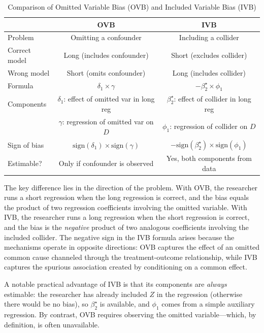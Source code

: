 \documentclass[
]{article}
\begin{document}
\begin{table}[H]
\centering
\caption{Comparison of Omitted Variable Bias (OVB) and Included Variable Bias (IVB)}
\label{tab:ovb_ivb}
\begin{tabular}{lcc}
\toprule
 & \textbf{OVB} & \textbf{IVB} \\
\midrule
Problem & Omitting a confounder & Including a collider \\
Correct model & Long (includes confounder) & Short (excludes collider) \\
Wrong model & Short (omits confounder) & Long (includes collider) \\
Formula & $\delta_1 \times \gamma$ & $-\beta_2^{\star} \times \phi_1$ \\
Components & $\delta_1$: effect of omitted var in long reg & $\beta_2^{\star}$: effect of collider in long reg \\
 & $\gamma$: regression of omitted var on $D$ & $\phi_1$: regression of collider on $D$ \\
Sign of bias & $\text{sign}(\delta_1) \times \text{sign}(\gamma)$ & $-\text{sign}(\beta_2^{\star}) \times \text{sign}(\phi_1)$ \\
Estimable? & Only if confounder is observed & Yes, both components from data \\
\bottomrule
\end{tabular}
\end{table}

The key difference lies in the direction of the problem. With OVB, the
researcher runs a short regression when the long regression is correct,
and the bias equals the product of two regression coefficients involving
the omitted variable. With IVB, the researcher runs a long regression
when the short regression is correct, and the bias is the
\emph{negative} product of two analogous coefficients involving the
included collider. The negative sign in the IVB formula arises because
the mechanisms operate in opposite directions: OVB captures the effect
of an omitted common cause channeled through the treatment-outcome
relationship, while IVB captures the spurious association created by
conditioning on a common effect.

A notable practical advantage of IVB is that its components are
\emph{always} estimable: the researcher has already included \(Z\) in
the regression (otherwise there would be no bias), so
\(\beta_2^{\star}\) is available, and \(\phi_1\) comes from a simple
auxiliary regression. By contrast, OVB requires observing the omitted
variable---which, by definition, is often unavailable.
\end{document}
